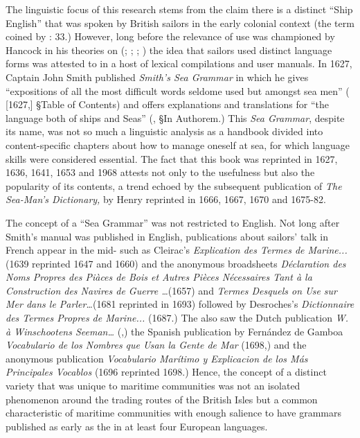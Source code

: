 The linguistic focus of this research stems from the claim there is a distinct “Ship English” that was spoken by British sailors in the early colonial context (the term coined by \citealt{Hancock1976}: 33.) However, long before the relevance of  use was championed by Hancock in his theories on  (\citealt{Hancock1972}; \citealt{Hancock1976}; \citealt{Hancock1986}; \citealt{Hancock1988}) the idea that sailors used distinct language forms was attested to in a host of lexical compilations and user manuals. In 1627, Captain John Smith published \textit{Smith’s Sea Grammar} in which he gives “expositions of all the most difficult words seldome used but amongst sea men” (\citealt{Smith1627} [1627,] §Table of Contents) and offers explanations and translations for “the language both of ships and Seas” (\citealt{Smith1627}, §In Authorem.) This \textit{Sea Grammar}, despite its name, was not so much a linguistic analysis as a handbook divided into content-specific chapters about how to manage oneself at sea, for which language skills were considered essential. The fact that this book was reprinted in 1627, 1636, 1641, 1653 and 1968 attests not only to the usefulness but also the popularity of its contents, a trend echoed by the subsequent publication of \textit{The Sea-Man’s Dictionary,} by Henry \citealt{Manwayring1644} reprinted in 1666, 1667, 1670 and 1675-82. 



The concept of a “Sea Grammar” was not restricted to English. Not long after Smith’s manual was published in English, publications about sailors’ talk in French appear in the mid- such as Cleirac’s \textit{Explication des Termes de Marine...} (1639 reprinted 1647 and 1660) and the anonymous broadsheets \textit{Déclaration des Noms Propres des Piàces de Bois et Autres Pièces Nécessaires Tant à la Construction des Navires de Guerre …}(1657) and \textit{Termes Desquels on Use sur Mer dans le Parler…}(1681 reprinted in 1693) followed by Desroches’s \textit{Dictionnaire des Termes Propres de Marine...} (1687.) The  also saw the Dutch publication \textit{W. à Winschootens Seeman…} (\citealt{Winschooten1681},) the Spanish publication by Fernández de Gamboa \textit{Vocabulario de los Nombres que Usan la Gente de Mar} (1698,) and the anonymous publication \textit{Vocabulario Marítimo y Explicacion de los Más Principales Vocablos} (1696 reprinted 1698.) Hence, the concept of a distinct variety that was unique to maritime communities was not an isolated phenomenon around the trading routes of the British Isles but a common characteristic of maritime communities with enough salience to have grammars published as early as the  in at least four European languages. 



